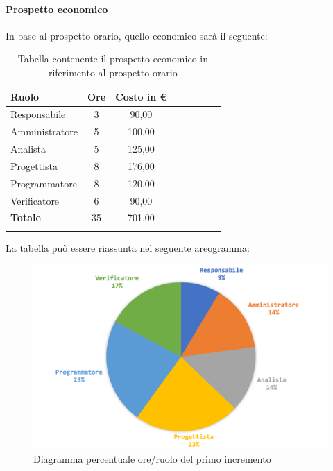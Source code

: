 			\paragraph{Prospetto economico}
			In base al prospetto orario, quello economico sarà il seguente: 
			
			\begin{longtable}{|l|c|c|c|c|c|c|c|}
				\hline
				\rowcolor{lighter-grayer}
				\textbf{Ruolo} & \textbf{Ore} & \textbf{Costo in € } \\
				\hline
				\endfirsthead
				
				\hline
				Responsabile 	    & 3 & 90,00\\
				\hline 
				\hline
				Amministratore	   & 5 & 100,00\\
				\hline
				\hline
				Analista 				& 5 & 125,00\\
				\hline
				\hline
				Progettista 		   & 8 & 176,00\\
				\hline
				\hline
				Programmatore 	  & 8 & 120,00\\
				\hline
				\hline
				Verificatore 		   & 6 & 90,00\\
				\hline
				\textbf{Totale} 	 & 35 & 701,00\\
				\hline
				\caption{Tabella contenente il prospetto economico in riferimento al prospetto orario}
			\end{longtable}
			\pagebreak
			
			La tabella può essere riassunta nel seguente areogramma:
			\begin{figure}[H]
				\centering
				\includegraphics[width=0.8\linewidth]{./images/preventivo/incremento1-2.png}
				\caption{Diagramma percentuale ore/ruolo del primo incremento}
				\label{fig:diagramma costi ruolo incremento I}
			\end{figure}
		
